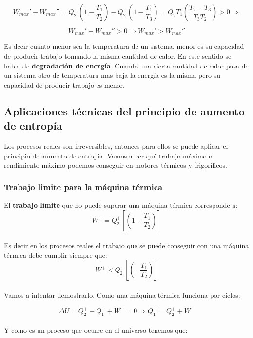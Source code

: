 \documentclass[12pt,a4paper]{article}
\newcommand{\parentesis}[1]{\left( #1 \right)}
\begin{document}
$$ W_{max}' - W_{max}'' = Q_2^+ \left( 1 - \dfrac{T_1}{T_2} \right) - Q_2^+ \left( 1 - \dfrac{T_1}{T_3} \right) = Q_2 T_1 \left( \dfrac{T_2-T_3}{T_3 T_2} \right) > 0 \Longrightarrow $$

$$ W_{max}' - W_{max} '' > 0 \Longrightarrow W_{max}' > W_{max}'' $$

Es decir cuanto menor sea la temperatura de un sistema, menor es su capacidad de producir trabajo tomando la misma cantidad de calor. En este sentido se habla de \textbf{degradación de energía}. Cuando una cierta cantidad de calor pasa de un sistema otro de temperatura mas baja la energía es la misma pero su capacidad de producir trabajo es menor. 


\subsection{Aplicaciones técnicas del principio de aumento de entropía}

Los procesos reales son irreversibles, entonces para ellos se puede aplicar el principio de aumento de entropía. Vamos a ver qué trabajo máximo o rendimiento máximo podemos conseguir en motores térmicos y frigoríficos. \\

\subsubsection{Trabajo limite para la máquina térmica}
El \textbf{trabajo límite} que no puede superar una máquina térmica corresponde a: \\

$$ W^+ = Q_2^+ \left[  \parentesis{1- \frac{T_1}{T_2}} \right] $$ \\


Es decir en los procesos reales el trabajo que se puede conseguir con una máquina térmica debe cumplir siempre que: \\

\begin{equation} 
W^+ < Q_2^+ \left[ \parentesis{- \frac{T_1}{T_2}} \right] 
\end{equation} \\

Vamos a intentar demostrarlo. Como una máquina térmica funciona por ciclos:

$$ \Delta U = Q_2^+ - Q_1^- + W^- = 0 \Longrightarrow   Q_1^+ = Q_2^+ + W^-$$ \\

Y como es un proceso que ocurre en el universo tenemos que: \\
\end{document}
